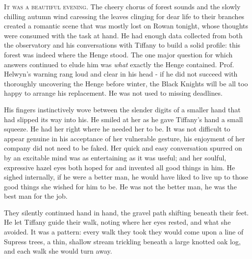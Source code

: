 \lettrine{I}{t was a beautiful evening}. The cheery chorus of forest sounds and the slowly chilling autumn wind caressing the leaves clinging for dear life to their branches 
created a romantic scene that was mostly lost on Rowan tonight, whose thoughts were consumed with the task at hand. 
He had enough data collected from both the observatory and his conversations with Tiffany to build a solid profile: this forest was indeed where the Henge stood.
The one major question for which answers continued to elude him was \textit{what} exactly the Henge contained.
Prof. Helwyn's warning rang loud and clear in his head - if he did not succeed with thoroughly uncovering the Henge before winter, 
the Black Knights will be all too happy to arrange his replacement.
He was not used to missing deadlines. 
\vspace{5mm}

His fingers instinctively wove between the slender digits of a smaller hand that had slipped its way into his.
He smiled at her as he gave Tiffany's hand a small squeeze. 
He had her right where he needed her to be. 
It was not difficult to appear genuine in his acceptance of her vulnerable gesture, his enjoyment of her company did not need to be faked. 
Her quick and easy conversation spurred on by an excitable mind was as entertaining as it was useful; 
and her soulful, expressive hazel eyes both hoped for and invented all good things in him. 
He sighed internally, if he were a better man, he would have liked to live up to those good things she wished for him to be. 
He was not the better man, he was the best man for the job.
\vspace{5mm}

They silently continued hand in hand, the gravel path shifting beneath their feet.
He let Tiffany guide their walk, noting where her eyes rested, and what she avoided.
It was a pattern: every walk they took they would come upon a line of Supress trees, a thin, shallow stream trickling beneath a large knotted oak log, 
and each walk she would turn away. 
\vspace{5mm}

